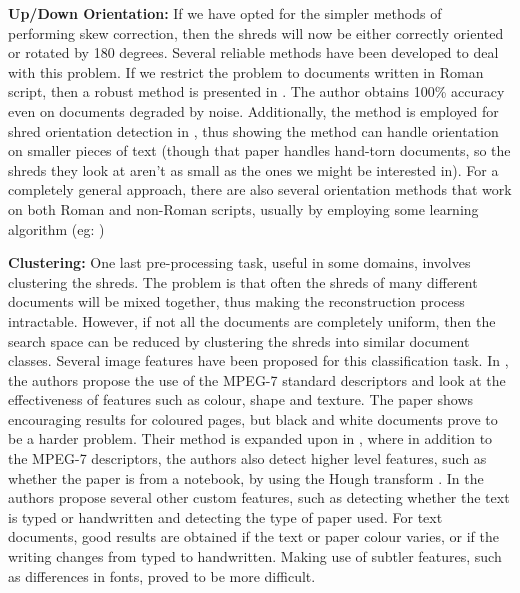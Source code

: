\textbf{Up/Down Orientation:} If we have opted for the simpler methods of performing skew correction, then the shreds will now be either correctly oriented or rotated by 180 degrees. Several reliable methods have been developed to deal with this problem. If we restrict the problem to documents written in Roman script, then a robust method is presented in \cite{P45}. The author obtains 100\% accuracy even on documents degraded by noise. Additionally, the method is employed for shred orientation detection in \cite{P32}, thus showing the method can handle orientation on smaller pieces of text (though that paper handles hand-torn documents, so the shreds they look at aren't as small as the ones we might be interested in). For a completely general approach, there are also several orientation methods that work on both Roman and non-Roman scripts, usually by employing some learning algorithm (eg: \cite{P46})

\textbf{Clustering:} One last pre-processing task, useful in some domains, involves clustering the shreds. The problem is that often the shreds of many different documents will be mixed together, thus making the reconstruction process intractable. However, if not all the documents are completely uniform, then the search space can be reduced by clustering the shreds into similar document classes. Several image features have been proposed for this classification task. In \cite{P47}, the authors propose the use of the MPEG-7 standard descriptors \cite{P48} and look at the effectiveness of features such as colour, shape and texture. The paper shows encouraging results for coloured pages, but black and white documents prove to be a harder problem. Their method is expanded upon in \cite{P49}, where in addition to the MPEG-7 descriptors, the authors also detect higher level features, such as whether the paper is from a notebook, by using the Hough transform \cite{P50}. In \cite{P32} the authors propose several other custom features, such as detecting whether the text is typed or handwritten and detecting the type of paper used. For text documents, good results are obtained if the text or paper colour varies, or if the writing changes from typed to handwritten. Making use of subtler features, such as differences in fonts, proved to be more difficult.
